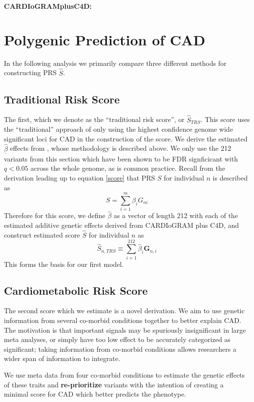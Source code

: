 \textbf{CARDIoGRAMplusC4D:} 


\section{Polygenic Prediction of CAD}

In the following analysis we primarily compare three different methods for constructing \ac{PRS} $\hat{S}$.

\subsection{Traditional Risk Score}

The first, which we denote as the ``traditional risk score'', or $\hat{S}_{TRS}$. This score uses the ``traditional'' approach of only using the highest confidence genome wide significant loci for \ac{CAD} in the construction of the score. We derive the estimated $\underline{\hat{\beta}}$ effects from \citep{TheCARDIoGRAMplusC4DConsortium2015}, whose methodology is described above. We only use the 212 variants from this section which have been shown to be FDR signficicant with $q < 0.05$ across the whole genome, as is common practice. Recall from the derivation leading up to equation \ref{score} that \ac{PRS} $S$ for individual $n$ is described as  $$ S = \sum^m_{i=1} \beta_i G_{ni} $$ Therefore for this score, we define $\hat{\beta}$ as a vector of length 212 with each of the estimated additive genetic effects derived from CARDIoGRAM plus C4D, and construct estimated score $\hat{S}$ for individual $n$ as $$ \hat{S}_{n, TRS} \equiv \sum^{212}_{i = 1} \hat{\beta}_i \mathbf{G}_{n, i} $$ This forms the basis for our first model.

\subsection{Cardiometabolic Risk Score}

The second score which we estimate is a novel derivation. We aim to use genetic information from several co-morbid conditions together to better explain \ac{CAD}. The motivation is that important signals may be spuriously insignificant in large meta analyses, or simply have too low effect to be accurately categorized as significant; taking information from co-morbid conditions allows researchers a wider span of information to integrate. 

We use meta data from four co-morbid conditions to estimate the genetic effects of these traits and \textbf{re-prioritize} variants with the intention of creating a minimal score for \ac{CAD} which better predicts the phenotype. 

